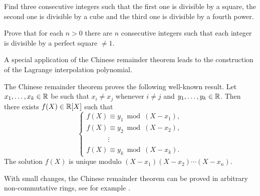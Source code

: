 \begin{bonus}
\label{xca:consecutive}
	Find three consecutive integers such that the first one is divisible by a square, 
	the second one is divisible by a cube and the third one is divisible by a fourth power. 	
\end{bonus}

\begin{bonus}
\label{xca:perfect_square}
	Prove that 
	for each $n>0$ there are $n$ consecutive integers such that 
	each integer is divisible by a perfect square $\ne 1$. 	
\end{bonus}

A special application of the Chinese remainder theorem leads to the construction of the Lagrange 
interpolation polynomial.

\begin{bonus}
	The Chinese remainder theorem proves the following well-known result. 
	Let $x_1,\dots,x_k\in\mathbb{R}$ be such that $x_i\ne x_j$ whenever $i\ne j$ 
	and $y_1,\dots,y_k\in\mathbb{R}$. Then there exists $f(X)\in\mathbb{R}[X]$ such that
	\[
	\begin{cases}
		f(X)\equiv y_1\bmod (X-x_1),\\
		f(X)\equiv y_2\bmod (X-x_2),\\
		\phantom{f(X)}\vdots\\
		f(X)\equiv y_k\bmod (X-x_k).  	
	\end{cases}
 	\]
 	The solution $f(X)$ is unique modulo $(X-x_1)(X-x_2)\cdots (X-x_n)$. 
\end{bonus}



With small changes, the Chinese remainder theorem can be proved 
in arbitrary non-commutative rings, see for example 
\cite[Chapter III, Theorem 2.25]{MR600654}. 

